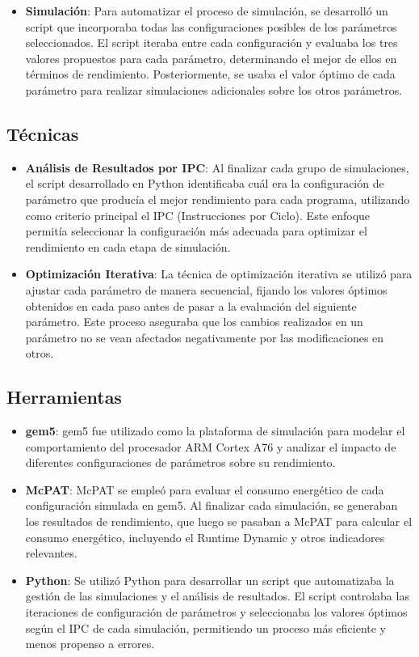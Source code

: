 \documentclass[conference]{IEEEtran}
\begin{document}
\begin{itemize}
    \item \textbf{Simulación}:  
    Para automatizar el proceso de simulación, se desarrolló un script que incorporaba todas las configuraciones posibles de los parámetros seleccionados. El script iteraba entre cada configuración y evaluaba los tres valores propuestos para cada parámetro, determinando el mejor de ellos en términos de rendimiento. Posteriormente, se usaba el valor óptimo de cada parámetro para realizar simulaciones adicionales sobre los otros parámetros.
\end{itemize}

\subsection{Técnicas}
\begin{itemize}
    \item \textbf{Análisis de Resultados por IPC}:  
    Al finalizar cada grupo de simulaciones, el script desarrollado en Python identificaba cuál era la configuración de parámetro que producía el mejor rendimiento para cada programa, utilizando como criterio principal el IPC (Instrucciones por Ciclo). Este enfoque permitía seleccionar la configuración más adecuada para optimizar el rendimiento en cada etapa de simulación.

    \item \textbf{Optimización Iterativa}:  
    La técnica de optimización iterativa se utilizó para ajustar cada parámetro de manera secuencial, fijando los valores óptimos obtenidos en cada paso antes de pasar a la evaluación del siguiente parámetro. Este proceso aseguraba que los cambios realizados en un parámetro no se vean afectados negativamente por las modificaciones en otros.
\end{itemize}

\subsection{Herramientas}
\begin{itemize}
    \item \textbf{gem5}:  
    gem5 fue utilizado como la plataforma de simulación para modelar el comportamiento del procesador ARM Cortex A76 y analizar el impacto de diferentes configuraciones de parámetros sobre su rendimiento.

    \item \textbf{McPAT}:  
    McPAT se empleó para evaluar el consumo energético de cada configuración simulada en gem5. Al finalizar cada simulación, se generaban los resultados de rendimiento, que luego se pasaban a McPAT para calcular el consumo energético, incluyendo el Runtime Dynamic y otros indicadores relevantes.

    \item \textbf{Python}:  
    Se utilizó Python para desarrollar un script que automatizaba la gestión de las simulaciones y el análisis de resultados. El script controlaba las iteraciones de configuración de parámetros y seleccionaba los valores óptimos según el IPC de cada simulación, permitiendo un proceso más eficiente y menos propenso a errores.
\end{itemize}
\end{document}
